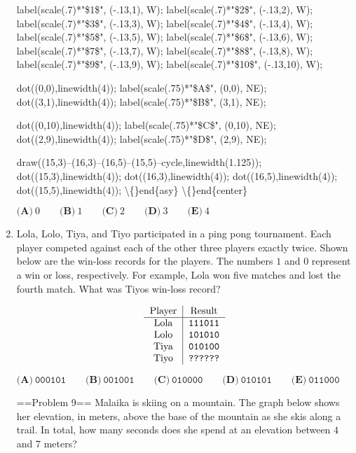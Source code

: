 \documentclass{article}
\begin{document}
\begin{enumerate}[label=\arabic*., itemsep=0.5em]
label(scale(.7)*"\$1\$", (-.13,1), W);
label(scale(.7)*"\$2\$", (-.13,2), W);
label(scale(.7)*"\$3\$", (-.13,3), W);
label(scale(.7)*"\$4\$", (-.13,4), W);
label(scale(.7)*"\$5\$", (-.13,5), W);
label(scale(.7)*"\$6\$", (-.13,6), W);
label(scale(.7)*"\$7\$", (-.13,7), W);
label(scale(.7)*"\$8\$", (-.13,8), W);
label(scale(.7)*"\$9\$", (-.13,9), W);
label(scale(.7)*"\$10\$", (-.13,10), W);


dot((0,0),linewidth(4));
label(scale(.75)*"\$A\$", (0,0), NE);
dot((3,1),linewidth(4));
label(scale(.75)*"\$B\$", (3,1), NE);

dot((0,10),linewidth(4));
label(scale(.75)*"\$C\$", (0,10), NE);
dot((2,9),linewidth(4));
label(scale(.75)*"\$D\$", (2,9), NE);

draw((15,3)--(16,3)--(16,5)--(15,5)--cycle,linewidth(1.125));
dot((15,3),linewidth(4));
dot((16,3),linewidth(4));
dot((16,5),linewidth(4));
dot((15,5),linewidth(4));
\textbackslash\{\}end\{asy\}
\textbackslash\{\}end\{center\}

\(\textbf{(A)}\ 0 \qquad \textbf{(B)}\ 1 \qquad \textbf{(C)}\ 2 \qquad \textbf{(D)}\ 3 \qquad \textbf{(E)}\ 4\)\par \vspace{0.5em}\item Lola, Lolo, Tiya, and Tiyo participated in a ping pong tournament. Each player competed against each of the other three players exactly twice. Shown below are the win-loss records for the players. The numbers \(1\) and \(0\) represent a win or loss, respectively. For example, Lola won five matches and lost the fourth match. What was Tiyos win-loss record?


\begin{equation*}
\begin{tabular}{c | c}
Player & Result \\
\hline
Lola & \texttt{111011}\\
Lolo & \texttt{101010}\\
Tiya & \texttt{010100}\\
Tiyo & \texttt{??????}
\end{tabular}
\end{equation*}


\(\textbf{(A)}\ \texttt{000101} \qquad \textbf{(B)}\ \texttt{001001} \qquad \textbf{(C)}\ \texttt{010000} \qquad \textbf{(D)}\ \texttt{010101} \qquad \textbf{(E)}\ \texttt{011000}\)



==Problem 9== 
Malaika is skiing on a mountain. The graph below shows her elevation, in meters, above the base of the mountain as she skis along a trail. In total, how many seconds does she spend at an elevation between \(4\) and \(7\) meters?


\end{enumerate}
\end{document}

